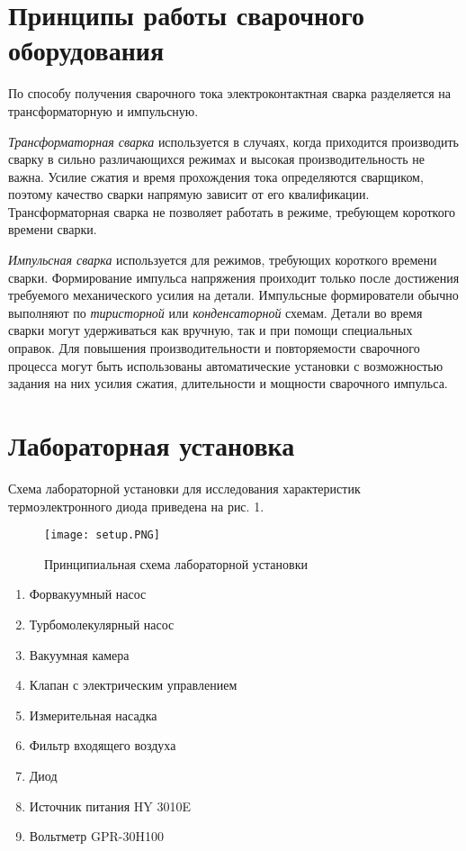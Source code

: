 \documentclass[a4paper]{article}
\begin{document}
\section{Принципы работы сварочного оборудования}
По способу получения сварочного тока электроконтактная сварка разделяется на трансформаторную и импульсную. \par
{\it Трансформаторная сварка} используется в случаях, когда приходится производить сварку в сильно различающихся режимах и высокая производительность не важна. Усилие сжатия и время прохождения тока определяются сварщиком, поэтому качество сварки напрямую зависит от его квалификации. Трансформаторная сварка не позволяет работать в режиме, требующем короткого времени сварки. \par 
{\it Импульсная сварка} используется для режимов, требующих короткого времени сварки. Формирование импульса напряжения проиходит только после достижения требуемого механического усилия на детали. Импульсные формирователи обычно выполняют по {\it тиристорной} или {\it конденсаторной} схемам. Детали во время сварки могут удерживаться как вручную, так и при помощи специальных оправок. Для повышения производительности и повторяемости сварочного процесса могут быть использованы автоматические установки с возможностью задания на них усилия сжатия, длительности и мощности сварочного импульса.  

\section{Лабораторная установка}
Схема лабораторной установки для исследования характеристик термоэлектронного диода приведена на рис. 1.

\begin{figure}[h]
    \centering
    \texttt{[image: setup.PNG]}
    \caption{Принципиальная схема лабораторной установки}
    \label{fig:vac}
\end{figure}
\begin{enumerate}
    \item Форвакуумный насос
\item Турбомолекулярный насос
\item Вакуумная камера
\item Клапан с электрическим управлением
\item Измерительная насадка
\item Фильтр входящего воздуха
\item Диод
\item Источник питания HY 3010E
\item Вольтметр GPR-30H100
\end{enumerate}
\end{document}
